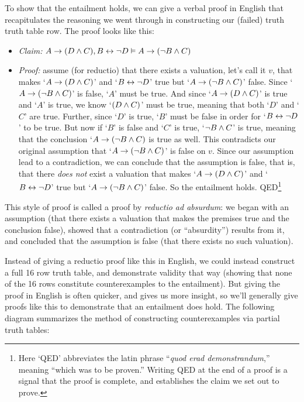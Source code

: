 To show that the entailment holds, we can give a verbal proof in English that recapitulates the reasoning we went through in constructing our (failed) truth truth table row. The proof looks like this:

\begin{itemize}
\item[] \emph{Claim:} $A \rightarrow (D \wedge C), B \leftrightarrow \neg D \vDash A \rightarrow (\neg B \wedge C)$
\item[] \emph{Proof:} assume (for reductio) that there exists a valuation, let's call it $v$, that makes `$A \rightarrow (D \wedge C)$' and  `$B \leftrightarrow \neg D$' true but  `$A \rightarrow (\neg B \wedge C)$' false.  Since  `$A \rightarrow (\neg B \wedge C)$'  is false, `$A$' must be true.  And since `$A \rightarrow (D \wedge C)$' is true and `$A$' is true, we know `$(D\wedge C)$' must be true, meaning that both `$D$' and `$C$' are true.  Further, since `$D$' is true, `$B$' must be false in order for `$B \leftrightarrow \neg D$' to be true.  But now if `$B$' is false and `$C$' is true, `$\neg B \wedge C$' is true, meaning that the conclusion `$A \rightarrow (\neg B \wedge C)$ is true as well.  This contradicts our original assumption that  `$A \rightarrow (\neg B \wedge C)$' is false on $v$.  Since our assumption lead to a contradiction, we can conclude that the assumption is false, that is, that there \emph{does not} exist a valuation that makes `$A \rightarrow (D \wedge C)$' and  `$B \leftrightarrow \neg D$' true but  `$A \rightarrow (\neg B \wedge C)$' false.  So the entailment holds. \hfill QED\footnote{Here `QED' abbreviates the latin phrase ``\emph{quod erad demonstrandum},'' meaning ``which was to be proven.'' Writing QED at the end of a proof is a signal that the proof is complete, and establishes the claim we set out to prove.}


\end{itemize}
This style of proof is called a proof by \emph{reductio ad absurdum}: we began with an assumption (that there exists a valuation that makes the premises true and the conclusion false), showed that a contradiction (or ``absurdity'')  results from it, and concluded that the assumption is false (that there exists no such valuation).


Instead of giving a reductio proof like this in English, we could instead construct a full 16 row truth table, and demonstrate validity that way (showing that none of the 16 rows constitute counterexamples to the entailment).  But giving the proof in English is often quicker, and gives us more insight, so we'll generally give proofs like this to demonstrate that an entailment does hold.  The following diagram summarizes the method of constructing counterexamples via partial truth tables:

